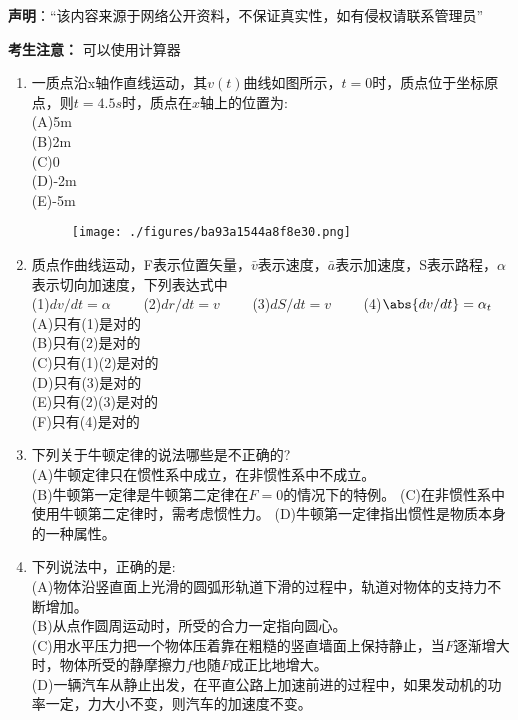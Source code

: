 
\textbf{声明}：“该内容来源于网络公开资料，不保证真实性，如有侵权请联系管理员”

\textbf{考生注意：}
可以使用计算器
\begin{enumerate}
\item 一质点沿x轴作直线运动，其$v(t)$曲线如图所示，$t=0$时，质点位于坐标原点，则$t=4.5s$时，质点在$x$轴上的位置为:\\
(A)5m\\
(B)2m\\
(C)0\\
(D)-2m\\
(E)-5m
\begin{figure}[ht]
\centering
\texttt{[image: ./figures/ba93a1544a8f8e30.png]}
\caption{} \label{fig_HDSD13_1}
\end{figure}
\item 质点作曲线运动，F表示位置矢量，$\bar v$表示速度，$\bar a$表示加速度，S表示路程，$\alpha$表示切向加速度，下列表达式中\\
(1)$dv/dt=\alpha \qquad$
(2)$dr/dt=v \qquad$
(3)$dS/dt=v\qquad$
(4)$\abs{dv/dt}=\alpha_t$\\
(A)只有(1)是对的\\
(B)只有(2)是对的\\
(C)只有(1)(2)是对的\\
(D)只有(3)是对的\\
(E)只有(2)(3)是对的\\
(F)只有(4)是对的
\item 下列关于牛顿定律的说法哪些是不正确的?\\
(A)牛顿定律只在惯性系中成立，在非惯性系中不成立。\\
(B)牛顿第一定律是牛顿第二定律在$F=0$的情况下的特例。
(C)在非惯性系中使用牛顿第二定律时，需考虑惯性力。
(D)牛顿第一定律指出惯性是物质本身的一种属性。
\item 下列说法中，正确的是:\\
(A)物体沿竖直面上光滑的圆弧形轨道下滑的过程中，轨道对物体的支持力不断增加。\\
(B)从点作圆周运动时，所受的合力一定指向圆心。\\
(C)用水平压力把一个物体压着靠在粗糙的竖直墙面上保持静止，当$F$逐渐增大时，物体所受的静摩擦力$f$也随$F$成正比地增大。\\
(D)一辆汽车从静止出发，在平直公路上加速前进的过程中，如果发动机的功率一定，力大小不变，则汽车的加速度不变。


\end{enumerate}
